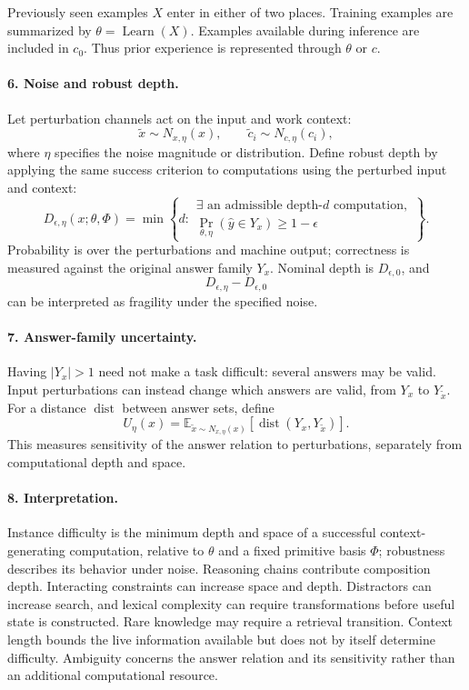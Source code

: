 \documentclass[11pt]{article}
\begin{document}
Previously seen examples $X$ enter in either of two places.
Training examples are summarized by
$\theta=\operatorname{Learn}(X)$.
Examples available during inference are included in $c_0$.
Thus prior experience is represented through $\theta$ or $c$.

\paragraph{6. Noise and robust depth.}
Let perturbation channels act on the input and work context:
\[
\widetilde{x}\sim N_{x,\eta}(x),
\qquad
\widetilde{c}_i\sim N_{c,\eta}(c_i),
\]
where $\eta$ specifies the noise magnitude or distribution.
Define robust depth by applying the same success criterion to
computations using the perturbed input and context:
\[
D_{\epsilon,\eta}(x;\theta,\Phi)
=
\min\left\{
d:
\begin{array}{l}
\exists\text{ an admissible depth-}d\text{ computation},\\
\Pr_{\theta,\eta}(\widehat y\in Y_x)\geq1-\epsilon
\end{array}
\right\}.
\]
Probability is over the perturbations and machine output; correctness
is measured against the original answer family $Y_x$.
Nominal depth is $D_{\epsilon,0}$, and
\[
D_{\epsilon,\eta}-D_{\epsilon,0}
\]
can be interpreted as fragility under the specified noise.

\paragraph{7. Answer-family uncertainty.}
Having $|Y_x|>1$ need not make a task difficult: several answers may
be valid. Input perturbations can instead change which answers are valid,
from $Y_x$ to $Y_{\widetilde{x}}$. For a distance $\operatorname{dist}$
between answer sets, define
\[
U_\eta(x)
=
\mathbb E_{\widetilde{x}\sim N_{x,\eta}(x)}
\left[
\operatorname{dist}(Y_x,Y_{\widetilde{x}})
\right].
\]
This measures sensitivity of the answer relation to perturbations,
separately from computational depth and space.

\paragraph{8. Interpretation.}
Instance difficulty is the minimum depth and space of a successful
context-generating computation, relative to $\theta$ and a fixed
primitive basis $\Phi$; robustness describes its behavior under noise.
Reasoning chains contribute composition depth. Interacting constraints
can increase space and depth. Distractors can increase search, and
lexical complexity can require transformations before useful state is
constructed. Rare knowledge may require a retrieval transition.
Context length bounds the live information available but does not by
itself determine difficulty. Ambiguity concerns the answer relation
and its sensitivity rather than an additional computational resource.
\end{document}
